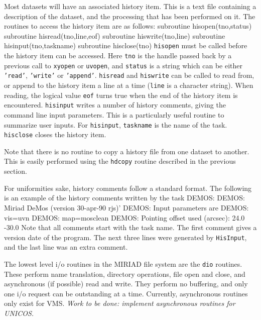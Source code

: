 
Most datasets will have an associated history item. This is a text file
containing a description of the dataset, and the processing that has been
performed on it. The routines to access the history item are as follows:
{\ninepoint\begintt
      subroutine hisopen(tno,status)
      subroutine hisread(tno,line,eof)
      subroutine hiswrite(tno,line)
      subroutine hisinput(tno,taskname)
      subroutine hisclose(tno)
\endtt}
{\tt hisopen} must be called before the history item can be accessed. Here
{\tt tno} is the handle passed back by a previous call to {\tt xyopen}
or {\tt uvopen}, and {\tt status} is a string which can be either
{\tt 'read'}, {\tt 'write'} or {\tt 'append'}. {\tt hisread} and {\tt hiswrite}
can be
called to read from, or append to the history item a line at a time
({\tt line} is a character string). When reading, the
logical value {\tt eof} turns true when the end of the history item is
encountered. {\tt hisinput} writes a number of history comments, giving
the command line input parameters. This is a particularly useful routine
to summarize user inputs. For {\tt hisinput}, {\tt taskname} is the name
of the task. {\tt hisclose} closes the history item.

Note that there is no routine to copy a history file from one dataset to
another. This is easily performed using the {\tt hdcopy} routine described
in the previous section.

For uniformities sake, history comments follow a standard format. The
following is an example of the history comments written by the task
DEMOS:
{\ninepoint\begintt
DEMOS: Miriad DeMos (version 30-apr-90 rjs)'
DEMOS: Input parameters are
DEMOS:   vis=uvn
DEMOS:   map=mosclean
DEMOS: Pointing offset used (arcsec):   24.0 -30.0
\endtt}
Note that all comments start with the task name. The first comment gives a
version date of the program. The next
three lines were generated by {\tt HisInput}, and the last line was an
extra comment.


The lowest level i/o routines in the MIRIAD file system are the {\tt dio}
routines. These perform name translation, directory operations,
file open and close, and asynchronous (if possible) read and write. They
perform no buffering, and only one i/o request can be outstanding at a time.
Currently, asynchronous routines only exist for VMS. {\it Work to be done:
implement asynchronous routines for UNICOS.}

